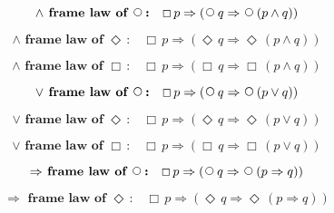 \documentclass[12pt, fleqn, leqno]{article}
\newcommand{\impl}{\ensuremath{\Rightarrow}}        %
\newcommand{\Next}{\;\,\text{\raisebox{3.5pt}{\circle{6}}}}
\newcommand{\Event}{\Diamond\,}
\newcommand{\Always}{\Box\,}
\newcommand{\spacer}{\vspace{-30pt}}
\begin{document}
\spacer

\begin{equation}\label{E:framelawnext}
\textbf{$\land$ frame law of $\Next$:}\quad \Always p \impl (\Next q \impl \Next (p \land q))
\end{equation}

\spacer

\begin{equation}\label{E:framelawEvent}
\textbf{$\land$ frame law of $\Event$:}\quad \Always p \impl (\Event q \impl \Event (p \land q))
\end{equation}

\spacer

\begin{equation}\label{E:framelawAlways}
\textbf{$\land$ frame law of $\Always$:}\quad \Always p \impl (\Always q \impl \Always (p \land q))
\end{equation}

\spacer
\begin{equation}\label{E:disjframelawnext}
\textbf{$\lor$ frame law of $\Next$:}\quad \Always p \impl (\Next q \impl \Next (p \lor q))
\end{equation}

\spacer

\begin{equation}\label{E:disjframelawEvent}
\textbf{$\lor$ frame law of $\Event$:}\quad \Always p \impl (\Event q \impl \Event (p \lor q))
\end{equation}

\spacer

\begin{equation}\label{E:disjframelawAlways}
\textbf{$\lor$ frame law of $\Always$:}\quad \Always p \impl (\Always q \impl \Always (p \lor q))
\end{equation}

\spacer

\begin{equation}\label{E:implframelawnext}
\textbf{$\impl$ frame law of $\Next$:}\quad \Always p \impl (\Next q \impl \Next (p \impl q))
\end{equation}

\spacer

\begin{equation}\label{E:implframelawEvent}
\textbf{$\impl$ frame law of $\Event$:}\quad \Always p \impl (\Event q \impl \Event (p \impl q))
\end{equation}
\end{document}

